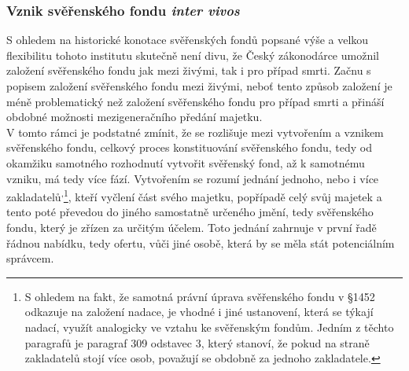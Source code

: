 \documentclass{article}
\begin{document}


\subsubsection{Vznik svěřenského fondu \textit{inter vivos}}

S ohledem na historické konotace svěřenských fondů popsané výše a velkou flexibilitu tohoto institutu skutečně není divu, že Český zákonodárce umožnil založení svěřenského fondu jak mezi živými, tak i pro případ smrti. Začnu s popisem založení svěřenského fondu mezi živými, neboť tento způsob založení je méně problematický než založení svěřenského fondu pro případ smrti a přináší obdobné možnosti mezigeneračního předání majetku.\\

V tomto rámci je podstatné zmínit, že se rozlišuje mezi vytvořením a vznikem svěřenského fondu, celkový proces konstituování svěřenského fondu, tedy od okamžiku samotného rozhodnutí vytvořit svěřenský fond, až k samotnému vzniku, má tedy více fází. Vytvořením se rozumí jednání jednoho, nebo i více zakladatelů\textsuperscript{,}\footnote{S ohledem na fakt, že samotná právní úprava svěřenského fondu v §1452 odkazuje na založení nadace, je vhodné i jiné ustanovení, která se týkají nadací, využít analogicky ve vztahu ke svěřenským fondům. Jedním z těchto paragrafů je paragraf  309 odstavec 3, který stanoví, že pokud na straně zakladatelů stojí více osob, považují se obdobně za jednoho zakladatele.}, kteří vyčlení část svého majetku, popřípadě celý svůj majetek a tento poté převedou do jiného samostatně určeného jmění, tedy svěřenského fondu, který je zřízen za určitým účelem. Toto jednání zahrnuje v první řadě řádnou nabídku, tedy ofertu, vůči jiné osobě, která by se měla stát potenciálním správcem.\\
\end{document}
